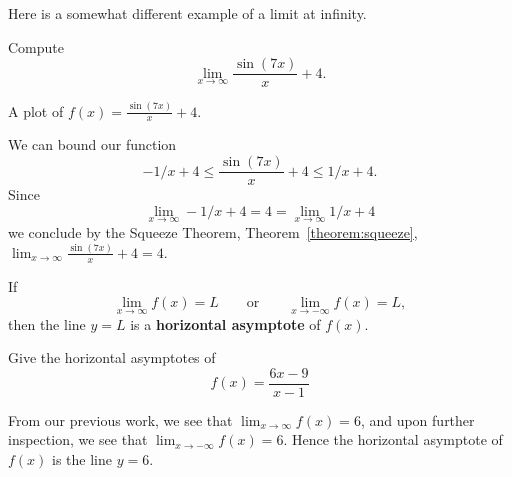 Here is a somewhat different example of a limit at infinity.

\begin{example}
Compute
\[
\lim_{x\to \infty} \frac{\sin(7x)}{x}+4.
\]
\end{example}

\begin{marginfigure}[0in]
\caption{A plot of $f(x)=\frac{\sin(7x)}{x}+4$.}
\label{plot:sin7x/x+4}
\end{marginfigure}

\begin{solution}
We can bound our function
\[
-1/x + 4 \le \frac{\sin(7x)}{x}+4 \le 1/x + 4.
\]
Since 
\[
\lim_{x\to \infty} -1/x + 4 = 4 = \lim_{x\to \infty}1/x + 4
\] 
we conclude by the Squeeze Theorem, Theorem~\ref{theorem:squeeze},
$\lim_{x\to\infty}\frac{\sin(7x)}{x}+4 = 4$.
\end{solution}






\begin{definition}\label{def:horiz asymptote}
If  
\[
\lim_{x\to \infty} f(x) = L \qquad\text{or}\qquad \lim_{x\to -\infty} f(x) = L,
\]
then the line $y=L$ is a \textbf{horizontal asymptote} of $f(x)$.
\end{definition}

\begin{example} 
Give the horizontal asymptotes of
\[
f(x) = \frac{6x-9}{x-1}
\]
\end{example}

\begin{solution}
From our previous work, we see that $\lim_{x\to \infty} f(x) = 6$, and
upon further inspection, we see that $\lim_{x\to -\infty} f(x) =
6$. Hence the horizontal asymptote of $f(x)$ is the line $y=6$.
\end{solution}


